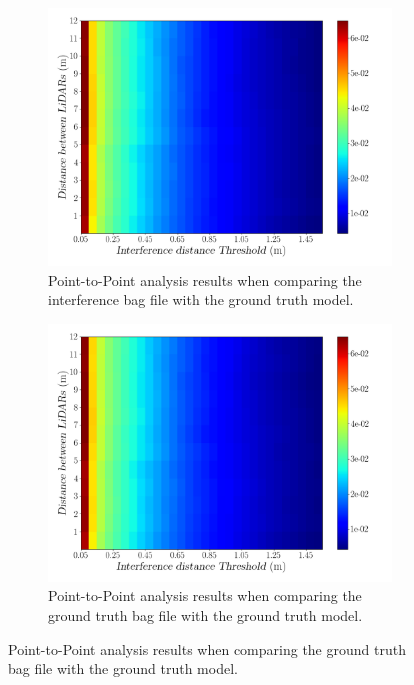 \begin{figure}[!ht]
	\centering
	\begin{subfigure}[c]{0.45\textwidth}
		\includegraphics[width=\textwidth]{img/lidar-interference/distance/interference_distance_color_mesh.png}
		\caption{Point-to-Point analysis results when comparing the interference bag file with the ground truth model.}
		\label{fig:distance:interference-color-mesh}
	\end{subfigure}
	\qquad
	\begin{subfigure}[c]{0.45\textwidth}
		\includegraphics[width=\textwidth]{img/lidar-interference/distance/ground_truth_distance_color_mesh.png}
		\caption{Point-to-Point analysis results when comparing the ground truth bag file with the ground truth model.}

\end{subfigure}
\end{figure}
